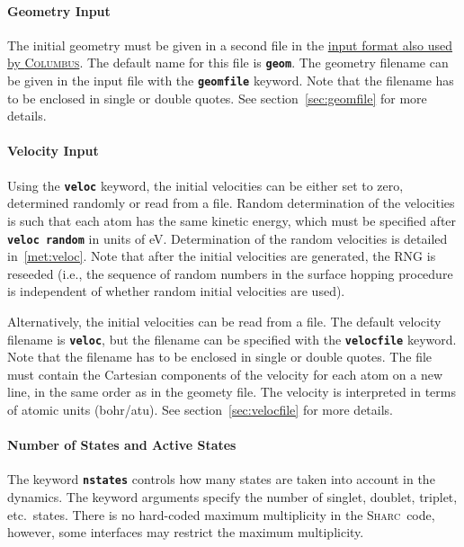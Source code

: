 \documentclass[a4paper,10pt,DIV=15,openany]{scrbook}
\newcommand{\link}[2]{\href{#1}{#2}}
\newcommand{\sharc}{\textsc{Sharc}}
\newcommand{\ttt}[1]{\textbf{\texttt{#1}}}
\begin{document}
\paragraph{Geometry Input}

The initial geometry must be given in a second file in the  \link{http://www.univie.ac.at/columbus/docs_COL70/documentation_main.html}{input format also used by \textsc{Columbus}}. The default name for this file is \ttt{geom}. The geometry filename can be given in the input file with the \ttt{geomfile} keyword. Note that the filename has to be enclosed in single or double quotes. See section~\ref{sec:geomfile} for more details.

\paragraph{Velocity Input}

Using the \ttt{veloc} keyword, the initial velocities can be either set to zero, determined randomly or read from a file. Random determination of the velocities is such that each atom has the same kinetic energy, which must be specified after \ttt{veloc random} in units of eV. Determination of the random velocities is detailed in~\ref{met:veloc}. Note that after the initial velocities are generated, the RNG is reseeded (i.e., the sequence of random numbers in the surface hopping procedure is independent of whether random initial velocities are used).

Alternatively, the initial velocities can be read from a file. 
The default velocity filename is \ttt{veloc}, but the filename can be specified with the \ttt{velocfile} keyword. Note that the filename has to be enclosed in single or double quotes. The file must contain the Cartesian components of the velocity for each atom on a new line, in the same order as in the geomety file. The velocity is interpreted in terms of atomic units (bohr/atu). See section~\ref{sec:velocfile} for more details.

\paragraph{Number of States and Active States}

The keyword \ttt{nstates} controls how many states are taken into account in the dynamics. The keyword arguments specify the number of singlet, doublet, triplet, etc.\ states. There is no hard-coded maximum multiplicity in the \sharc\ code, however, some interfaces may restrict the maximum multiplicity. 
\end{document}
